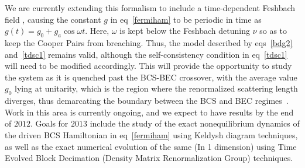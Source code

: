 \documentclass[a4paper,10pt]{report}
\begin{document}
We are currently extending this formalism to include a time-dependent Feshbach field , causing the constant $g$ in eq\ \ref{fermiham} to be periodic in time as $g(t)=g_0+g_a\cos{\omega t}$. Here, $\omega$ is kept below the Feshbach detuning $\nu$ so as to keep the Cooper Pairs from breaching. Thus, the model described by eqs\ \ref{bdg2} and\ \ref{tdsc1} remains valid, although the self-consistency condition in eq\ \ref{tdsc1} will need to be modified accordingly. This will provide the opportunity to study the system as it is quenched past the BCS-BEC crossover, with the average value  $g_0$ lying at unitarity, which is the region where the renormalized scattering length diverges, thus demarcating the boundary between the BCS and BEC regimes~\cite{leggett1}. Work in this area is currently ongoing, and we expect to have results by the end of $2012$. Goals for $2013$ include the study of the exact nonequilibrium dynamics of the driven BCS Hamiltonian in eq\ \ref{fermiham} using Keldysh diagram techniques, as 
well as the exact numerical evolution of the same (In 1 dimension) using Time Evolved Block Decimation (Density Matrix Renormalization Group) techniques.
\end{document}
